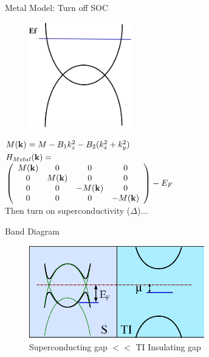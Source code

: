 \documentclass[]{beamer}
\def\ket#1{\vert #1 \rangle}
\begin{document}
\begin{frame}{Metal Model: Turn off SOC}
\begin{figure}
\includegraphics[width=1.75in]{include/metalband.png}\\
\end{figure}
$M({\bf k})=M-B_1 k_z ^2 - B_2 (k_x^2 + k_y^2)$
\vspace{1cm}\\
$
H_{Metal}({\bf k})=
$
\vspace{.5cm}\\
$
\left( \begin{array}{cccc}
M({\bf k}) & 0 &0  & 0 \\
0 &M({\bf k})& 0 & 0 \\
0 &0 &-M({\bf k}) & 0 \\
0 & 0 &0 & -M({\bf k}) \\
 \end{array} \right)-E_F 
$\\
\vspace{1cm}
Then turn on superconductivity ($\Delta$)...

\end{frame}


\begin{frame}{Band Diagram}
\begin{figure}
\includegraphics[width=3in]{include/setup.eps}\\
\center
Superconducting gap $<<$ TI Insulating gap
\end{figure}
\end{frame}
\end{document}
